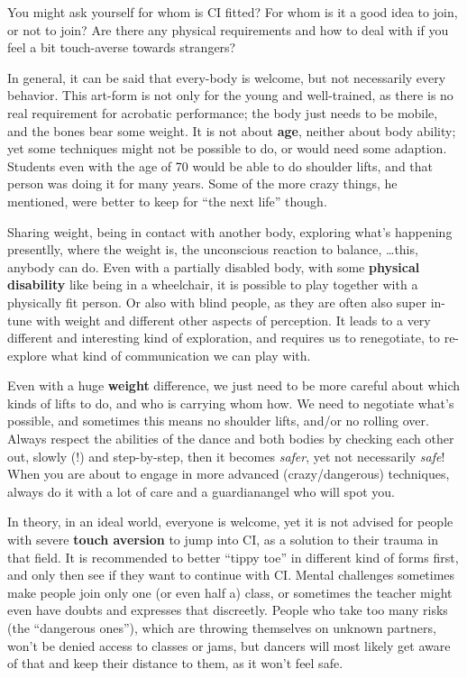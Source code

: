 You might ask yourself for whom is CI fitted?
For whom is it a good idea to join, or not to join?
Are there any physical requirements and how to deal with if you feel a bit touch-averse towards strangers?

In general, it can be said that every-body is welcome, but not necessarily every behavior.
This art-form is not only for the young and well-trained, as there is no real requirement for acrobatic performance; the body just needs to be mobile, and the bones bear some weight.
It is not about \textbf{age}, neither about body ability; yet some techniques might not be possible to do, or would need some adaption.
Students even with the age of 70 would be able to do shoulder lifts, and that person was doing it for many years.
Some of the more crazy things, he mentioned, were better to keep for ``the next life'' though.

Sharing weight, being in contact with another body, exploring what's happening presentlly, where the weight is, the unconscious reaction to balance, \ldots this, anybody can do.
Even with a partially disabled body, with some \textbf{physical disability} like being in a wheelchair, it is possible to play together with a physically fit person.
Or also with blind people, as they are often also super in-tune with weight and different other aspects of perception.
It leads to a very different and interesting kind of exploration, and requires us to renegotiate, to re-explore what kind of communication we can play with.

Even with a huge \textbf{weight} difference, we just need to be more careful about which kinds of lifts to do, and who is carrying whom how.
We need to negotiate what's possible, and sometimes this means no shoulder lifts, and/or no rolling over.
Always respect the abilities of the dance and both bodies by checking each other out, slowly (!) and step-by-step, then it becomes \textit{safer}, yet not necessarily \textit{safe}!
When you are about to engage in more advanced (crazy/dangerous) techniques, always do it with a lot of care and a \gls{guardianangel} who will spot you.

In theory, in an ideal world, everyone is welcome, yet it is not advised for people with severe \textbf{touch aversion} to jump into CI, as a solution to their trauma in that field.
It is recommended to better ``tippy toe'' in different kind of forms first, and only then see if they want to continue with CI\@.
Mental challenges sometimes make people join only one (or even half a) class, or sometimes the teacher might even have doubts and expresses that discreetly.
People who take too many risks (the ``dangerous ones''), which are throwing themselves on unknown partners, won't be denied access to classes or jams, but dancers will most likely get aware of that and keep their distance to them, as it won't feel safe.


